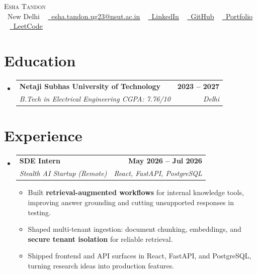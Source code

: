 \documentclass[letterpaper,11pt]{article}
\makeatletter
\newcommand{\resumeItem}[1]{\item{{#1 \vspace{-1pt}}}}
\newcommand{\resumeSubheading}[4]{
  \vspace{-2pt}\item
    \begin{tabular*}{1.0\textwidth}[t]{l@{\extracolsep{\fill}}r}
      \textbf{#1} & \textbf{\small #2} \\
      \textit{\small#3} & \textit{\small #4} \\
    \end{tabular*}\vspace{-6pt}
}
\newcommand{\resumeItemListStart}{\begin{itemize}[itemsep=1.5pt, parsep=0pt, topsep=2pt]}
\newcommand{\resumeItemListEnd}{\end{itemize}\vspace{-6pt}}
\newcommand{\resumeSubHeadingListStart}{\begin{itemize}[leftmargin=0.0in, label={}]}
\newcommand{\resumeSubHeadingListEnd}{\end{itemize}}
\makeatother
\begin{document}
\begin{center}
    {\Huge \scshape Esha Tandon} \\ \vspace{4pt}
    \small \faMapMarker\ New Delhi ~
    \href{mailto:esha.tandon.ug23@nsut.ac.in}{\faEnvelope\ \underline{esha.tandon.ug23@nsut.ac.in}} ~
    \href{https://www.linkedin.com/in/esha-tandon-b7b183357}{\faLinkedin\ \underline{LinkedIn}} ~
    \href{https://github.com/dev-0410}{\faGithub\ \underline{GitHub}} ~
    \href{https://esha-portfolio-ecru.vercel.app/}{\faGlobe\ \underline{Portfolio}} ~
    \href{https://leetcode.com/u/Esha_10_Tandon/}{\faCode\ \underline{LeetCode}}
\end{center}

\section{Education}
\resumeSubHeadingListStart
  \resumeSubheading
    {Netaji Subhas University of Technology}{2023 -- 2027}
    {B.Tech in Electrical Engineering \textbar{} CGPA: 7.76/10}{Delhi}
\resumeSubHeadingListEnd

\section{Experience}
\resumeSubHeadingListStart
  \resumeSubheading
    {SDE Intern}{May 2026 -- Jul 2026}
    {Stealth AI Startup (Remote)}{React, FastAPI, PostgreSQL}
    \resumeItemListStart
      \resumeItem{Built \textbf{retrieval-augmented workflows} for internal knowledge tools, improving answer grounding and cutting unsupported responses in testing.}
      \resumeItem{Shaped multi-tenant ingestion: document chunking, embeddings, and \textbf{secure tenant isolation} for reliable retrieval.}
      \resumeItem{Shipped frontend and API surfaces in React, FastAPI, and PostgreSQL, turning research ideas into production features.}
    \resumeItemListEnd
\resumeSubHeadingListEnd

\end{document}

